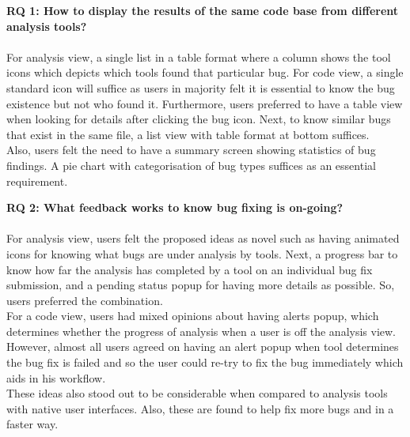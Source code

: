 \begin{myboxi}{{\textbf{RQ 1: How to display the results of the same code base from different analysis tools?}}}
\\ \\ For analysis view, a single list in a table format where a column shows the tool icons which depicts which tools found that particular bug. For code view, a single standard icon will suffice as users in majority felt it is essential to know the bug existence but not who found it. Furthermore, users preferred to have a table view when looking for details after clicking the bug icon. Next, to know similar bugs that exist in the same file, a list view with table format at bottom suffices. \\

Also, users felt the need to have a summary screen showing statistics of bug findings. A pie chart with categorisation of bug types suffices as an essential requirement. \\
\end{myboxi}

\begin{myboxi}{{\textbf{RQ 2: What feedback works to know bug fixing is on-going?}}}
\\ \\ For analysis view, users felt the proposed ideas as novel such as having animated icons for knowing what bugs are under analysis by tools. Next, a progress bar to know how far the analysis has completed by a tool on an individual bug fix submission, and a pending status popup for having more details as possible. So, users preferred the combination. \\

For a code view, users had mixed opinions about having alerts popup, which determines whether the progress of analysis when a user is off the analysis view. However, almost all users agreed on having an alert popup when tool determines the bug fix is failed and so the user could re-try to fix the bug immediately which aids in his workflow. \\

These ideas also stood out to be considerable when compared to analysis tools with native user interfaces. Also, these are found to help fix more bugs and in a faster way.

\end{myboxi}
	
